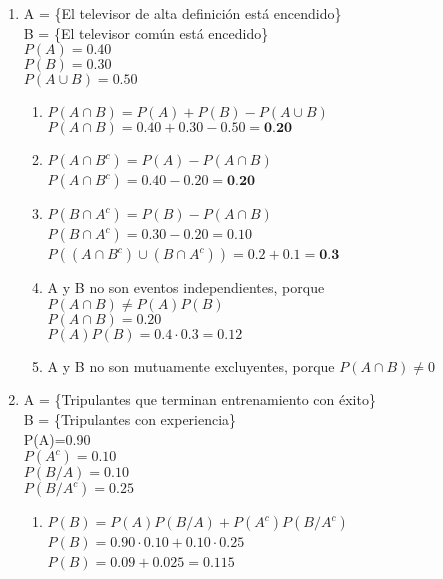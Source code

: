 \documentclass[12pt,letterpaper]{article}
\begin{document}
\begin{enumerate}
        \item
            A = \{El televisor de alta definición está encendido\} \\
            B = \{El televisor común está encedido\} \\
            $P(A)=0.40$\\
            $P(B)=0.30$\\
            $P(A \cup B)=0.50$\\
            \begin{enumerate}
                \item
                    $P(A \cap B)= P(A)+P(B)-P(A \cup B)$\\
                    $P(A \cap B)= 0.40+0.30-0.50=\textbf{0.20}$\\
                \item
                    $P(A \cap B^{c})=P(A)-P(A \cap B)$ \\
                    $P(A \cap B^{c})=0.40 -0.20 =\textbf{0.20}$ \\
                \item
                    $P(B \cap A^{c})=P(B)-P(A \cap B)$ \\
                    $P(B \cap A^{c})=0.30 -0.20 =0.10$ \\
                    $P((A \cap B^{c})\cup(B \cap A^{c}))= 0.2 + 0.1 = \textbf{0.3}$ \\
                \item
                    A y B no son eventos independientes, porque $P(A \cap B)\neq P(A)P(B)$\\
                    $P(A \cap B) = 0.20$\\
                    $P(A)P(B) = 0.4 \cdot 0.3 = 0.12$
                \item
                    A y B no son mutuamente excluyentes, porque $P(A \cap B)\neq 0$\\
            \end{enumerate}

        \item
            A = \{Tripulantes que terminan entrenamiento con éxito\}\\
            B = \{Tripulantes con experiencia\}\\
            P(A)=0.90\\
            $P(A^{c})=0.10$\\
            $P(B/A)=0.10$\\
            $P(B / A^{c})=0.25$\\
            \begin{enumerate}
                \item
                    $P(B)=P(A)P(B/A)+P(A^{c})P(B/A^{c})$\\
                    $P(B)=0.90\cdot0.10 + 0.10\cdot0.25$ \\
                    $P(B)= 0.09 + 0.025 = 0.115$ \\


\end{enumerate}
\end{enumerate}
\end{document}
